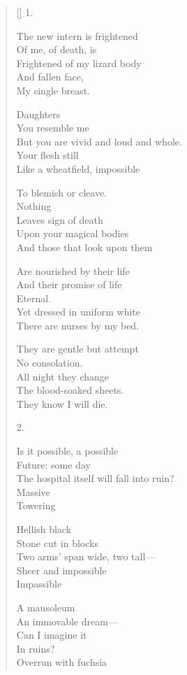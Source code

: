 \label{ch:theknowledge}
\settowidth{\versewidth}{The hospital itself will fall into ruin?}
\begin{verse}[\versewidth]
  1.
  
The new intern is frightened\\
Of me, of death, is\\
Frightened of my lizard body\\
And fallen face,\\
My single breast.

Daughters\\
You resemble me\\
But you are vivid and loud and whole.\\
Your flesh still\\
Like a wheatfield, impossible

To blemish or cleave.\\
Nothing\\
Leaves sign of death\\
Upon your magical bodies\\
And those that look upon them

Are nourished by their life\\
And their promise of life\\
Eternal.\\
Yet dressed in uniform white\\
There are nurses by my bed.

They are gentle but attempt\\
No consolation.\\
All night they change\\
The blood-soaked sheets.\\
They know I will die.

2.

Is it possible, a possible\\
Future: some day\\
The hospital itself will fall into ruin?\\
Massive\\
Towering

Hellish black\\
Stone cut in blocks\\
Two arms' span wide, two tall---\\
Sheer and impossible\\
Impassible

A mausoleum\\
An immovable dream---\\
Can I imagine it \\
In ruins?\\
Overrun with fuchsia


\end{verse}
